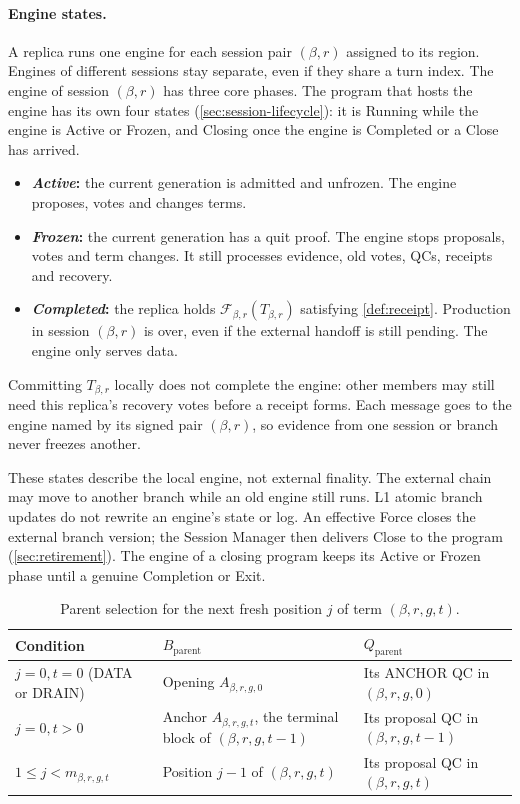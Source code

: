 \documentclass[11pt,a4paper]{article}
\newcommand{\FC}{\mathcal F}
\newcommand{\defterm}[1]{\textcolor{rrBlue}{\textit{#1}}}
\begin{document}
\paragraph{Engine states.}
A replica runs one engine for each session pair $(\beta,r)$ assigned to
its region. Engines of different sessions stay separate, even if they
share a turn index. The engine of session $(\beta,r)$ has three core
phases. The program that hosts the engine has its own four states
(\cref{sec:session-lifecycle}): it is Running while the engine is Active
or Frozen, and Closing once the engine is Completed or a Close has
arrived.
\begin{itemize}
\item \textbf{\defterm{Active}:} the current generation is admitted and
unfrozen. The engine proposes, votes and changes terms.
\item \textbf{\defterm{Frozen}:} the current generation has a quit proof.
The engine stops proposals, votes and term changes. It still processes
evidence, old votes, QCs, receipts and recovery.
\item \textbf{\defterm{Completed}:} the replica holds
$\FC_{\beta,r}(T_{\beta,r})$ satisfying \cref{def:receipt}. Production in
session $(\beta,r)$ is over, even if the external handoff is still
pending. The engine only serves data.
\end{itemize}
Committing $T_{\beta,r}$ locally does not complete the engine: other
members may still need this replica's recovery votes before a receipt
forms. Each message goes to the engine named by its signed pair
$(\beta,r)$, so evidence from one session or branch never freezes
another.

These states describe the local engine, not external finality. The
external chain may move to another branch while an old engine still
runs. L1 atomic branch updates do not rewrite an engine's state or log. An
effective Force closes the external branch version; the Session Manager
then delivers Close to the program (\cref{sec:retirement}). The engine
of a closing program keeps its Active or Frozen phase until a genuine
Completion or Exit.

\begin{table}[htbp]\centering\small
\caption{Parent selection for the next fresh position $j$ of term $(\beta,r,g,t)$.}
\label{tab:parent}
\begin{tabularx}{\linewidth}{@{}l Y Y@{}}
\toprule
Condition & $B_{\mathrm{parent}}$ & $Q_{\mathrm{parent}}$\\
\midrule
$j=0,t=0$ (DATA or DRAIN) & Opening $A_{\beta,r,g,0}$ & Its ANCHOR QC in $(\beta,r,g,0)$\\
$j=0,t>0$ & Anchor $A_{\beta,r,g,t}$, the terminal block of $(\beta,r,g,t-1)$ & Its proposal QC in $(\beta,r,g,t-1)$\\
$1\le j<m_{\beta,r,g,t}$ & Position $j-1$ of $(\beta,r,g,t)$ & Its proposal QC in $(\beta,r,g,t)$\\
\bottomrule
\end{tabularx}
\end{table}
\end{document}
